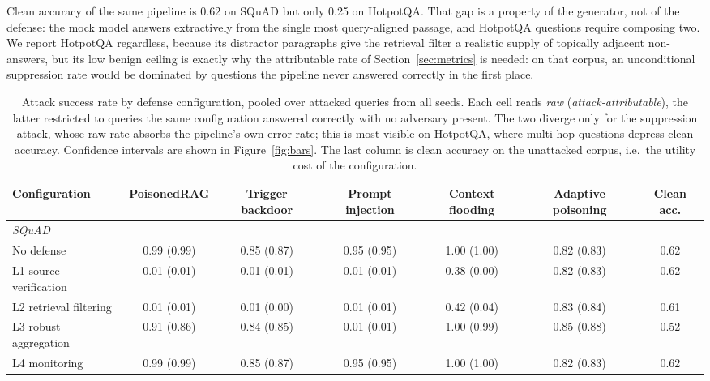 \documentclass[information,article,submit,moreauthors]{Definitions/mdpi}
\newcommand{\cleanAccHotpotqanone}{0.25}
\newcommand{\cleanAccSquadnone}{0.62}
\begin{document}
Clean accuracy of the same pipeline is \cleanAccSquadnone{} on SQuAD but only
\cleanAccHotpotqanone{} on HotpotQA. That gap is a property of the generator, not of the
defense: the mock model answers extractively from the single most query-aligned passage, and
HotpotQA questions require composing two. We report HotpotQA regardless, because its distractor
paragraphs give the retrieval filter a realistic supply of topically adjacent non-answers, but
its low benign ceiling is exactly why the attributable rate of Section~\ref{sec:metrics} is
needed: on that corpus, an unconditional suppression rate would be dominated by questions the
pipeline never answered correctly in the first place.

\begin{table}[H]
\small
\caption{Attack success rate by defense configuration, pooled over attacked queries from all seeds. Each cell reads \emph{raw} (\emph{attack-attributable}), the latter restricted to queries the same configuration answered correctly with no adversary present. The two diverge only for the suppression attack, whose raw rate absorbs the pipeline's own error rate; this is most visible on HotpotQA, where multi-hop questions depress clean accuracy. Confidence intervals are shown in Figure~\ref{fig:bars}. The last column is clean accuracy on the unattacked corpus, i.e.\ the utility cost of the configuration.\label{tab:main}}
\begin{tabular}{lcccccc}
\toprule
\textbf{Configuration} & \textbf{PoisonedRAG} & \textbf{Trigger backdoor} & \textbf{Prompt injection} & \textbf{Context flooding} & \textbf{Adaptive poisoning} & \textbf{Clean acc.}\\
\midrule
\multicolumn{7}{l}{\textit{SQuAD}}\\
\quad No defense & 0.99 \tiny(0.99) & 0.85 \tiny(0.87) & 0.95 \tiny(0.95) & 1.00 \tiny(1.00) & 0.82 \tiny(0.83) & 0.62\\
\quad L1 source verification & 0.01 \tiny(0.01) & 0.01 \tiny(0.01) & 0.01 \tiny(0.01) & 0.38 \tiny(0.00) & 0.82 \tiny(0.83) & 0.62\\
\quad L2 retrieval filtering & 0.01 \tiny(0.01) & 0.01 \tiny(0.00) & 0.01 \tiny(0.01) & 0.42 \tiny(0.04) & 0.83 \tiny(0.84) & 0.61\\
\quad L3 robust aggregation & 0.91 \tiny(0.86) & 0.84 \tiny(0.85) & 0.01 \tiny(0.01) & 1.00 \tiny(0.99) & 0.85 \tiny(0.88) & 0.52\\
\quad L4 monitoring & 0.99 \tiny(0.99) & 0.85 \tiny(0.87) & 0.95 \tiny(0.95) & 1.00 \tiny(1.00) & 0.82 \tiny(0.83) & 0.62\\

\end{tabular}
\end{table}
\end{document}
